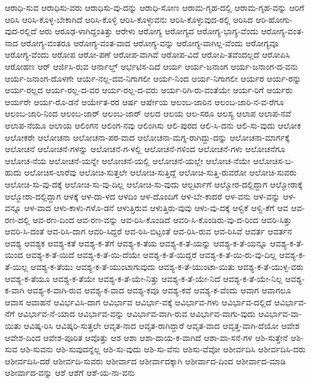 ಆರಾಧಿ-ಸುವ
ಆರಾಧಿಸು-ವರು
ಆರಾಧಿಸು-ವು-ದನ್ನು
ಆರಾಧಿ-ಸೋಣ
ಆರಾಮ-ಗೃಹ-ದಲ್ಲಿ
ಆರಾಮ-ಗೃಹ-ವನ್ನು
ಆರಿಗೆ
ಆರಿಸಿ
ಆರಿಸಿ-ಕೊಳ್ಳ-ಬೇಕಾಗಿದೆ
ಆರಿಸಿ-ಕೊಳ್ಳಿ
ಆರಿಸಿ-ಕೊಳ್ಳುವನು
ಆರಿಸಿ-ಕೊಳ್ಳುವುದ-ರಲ್ಲಿ
ಆರಿಸಿದ
ಆರಿ-ಹೋಗು-ವುದ-ರಲ್ಲಿದೆ
ಆರು
ಆರೂಢ-ಳಾಗಿದ್ದಂತಿತ್ತು
ಆರೇಳು
ಆರೋಗ್ಯ
ಆರೋಗ್ಯದ
ಆರೋಗ್ಯ-ಭಾಗ್ಯ-ವೆಂದು
ಆರೋಗ್ಯ-ವಂತ-ನಾದ
ಆರೋಗ್ಯ-ವಂತರೂ
ಆರೋಗ್ಯ-ವಂತ-ವಾದ
ಆರೋಗ್ಯ-ವನ್ನು
ಆರೋಗ್ಯ-ವಾಗಿಲ್ಲ-ವೆಂದು
ಆರೋಗ್ಯವೂ
ಆರೋಗ್ಯ-ವೆಂದು
ಆರೋಪ
ಆರೋ-ಪಣೆ
ಆರೋಪ-ವಾಗಿವೆ
ಆರೋಪ-ವಿದೆ
ಆರೋಪಿ-ತವೆಂದಲ್ಲದೆ
ಆರೋಪಿಸಿ
ಆರೋಹಣ
ಆರ್
ಆರ್ಜಿಸಿ-ರುವ
ಆರ್ನಾಲ್ಡ್
ಆರ್ಭಟಿಸ-ದಿದೆ
ಆರ್ಯ
ಆರ್ಯ-ಜನಾಂಗ
ಆರ್ಯ-ಜನಾಂಗ-ದ-ವನು
ಆರ್ಯ-ಜನಾಂಗ-ದೊಳಗೇ
ಆರ್ಯ-ನಲ್ಲ-ದವ-ನಿಗಾಗಲೀ
ಆರ್ಯ-ನಿಂದ
ಆರ್ಯ-ನಿಗಾಗಲೀ
ಆರ್ಯರ
ಆರ್ಯ-ರನ್ನು
ಆರ್ಯ-ರಲ್ಲದ
ಆರ್ಯ-ರಲ್ಲ-ದ-ವರ
ಆರ್ಯ-ರಲ್ಲ-ದ-ವರು
ಆರ್ಯ-ರಿಗಿ-ರು-ವಂತೆಯೇ
ಆರ್ಯ-ರಿಗೆ
ಆರ್ಯರು
ಆರ್ಯರೇ
ಆರ್ಯ-ರೊ-ಡನೆ
ಆರ್ಯೇತ-ರರ
ಆರ್ಷ
ಆರ್ಷೇಯ
ಆಲಂಬ-ಜಾರಿನ
ಆಲಂಬ-ಜಾರಿ-ನ-ವ-ರೆಗೂ
ಆಲಂಬ-ಜಾರಿ-ನಿಂದ
ಆಲಂಬ-ಜಾರ್
ಆಲಂಬ-ಜಾರ್‌
ಆಲದ
ಆಲಯ
ಆಲ-ಸರೂ
ಆಲಸ್ಯ
ಆಲಾಪ
ಆಲಾಪ-ನವೆ
ಆಲಾಪ-ನೆಯೂ
ಆಲಾಯ
ಆಲಿಂಗನ
ಆಲಿಂಗ-ನವು
ಆಲಿಂಗಿಸು
ಆಲಿ-ಪುರದ
ಆಲಿ-ಸಿ-ದನು
ಆಲಿ-ಸು-ವುದು
ಆಲೋಕ
ಆಲೋಕರೇ
ಆಲೋಚನಾ
ಆಲೋಚನಾ-ಪರ-ವಾದ
ಆಲೋಚನಾ-ಮಗ್ನ-ರಾಗಿದ್ದು-ದನ್ನು
ಆಲೋಚನಾ-ಮಾರ್ಗಕ್ಕೆ
ಆಲೋಚನೆ
ಆಲೋಚನೆ-ಗಳನ್ನು
ಆಲೋಚನೆ-ಗ-ಳಲ್ಲಿ
ಆಲೋಚನೆ-ಗಳಿಂದ
ಆಲೋಚನೆ-ಗಳು
ಆಲೋಚನೆಗೂ
ಆಲೋಚ-ನೆಯ
ಆಲೋಚನೆ-ಯನ್ನೇ
ಆಲೋಚನೆ-ಯಲ್ಲಿ
ಆಲೋಚನೆ-ಯಲ್ಲೇ
ಆಲೋಚ-ನೆಯೇ
ಆಲೋಚಿಸ-ಬ-ಹುದು
ಆಲೋಚಿಸ-ಲಾರೆವು
ಆಲೋಚಿ-ಸುತ್ತಲೇ
ಆಲೋಚಿ-ಸುತ್ತಿದ್ದೆ
ಆಲೋಚಿ-ಸುತ್ತಿ-ರುವರೋ
ಆಲೋಚಿ-ಸುವರು
ಆಲೋಚಿ-ಸು-ವು-ದಕ್ಕೆ
ಆಲೋಚಿ-ಸು-ವು-ದಿಲ್ಲ
ಆಲೋಚಿ-ಸು-ವುದು
ಆಲ್ಬರ್ಟಾಗೆ
ಆಲ್ಮೋರ-ದಲ್ಲಿದ್ದಾಗ
ಆಲ್ಮೋರಾಕ್ಕೆ
ಆಲ್ಮೋರಾ-ದಲ್ಲಿದ್ದಾಗ
ಆಳಕ್ಕೆ
ಆಳ-ದಾ-ಳದ
ಆಳದಿಂ
ಆಳ-ದೊಂದಿಗೆ
ಆಳ-ಬೇ-ಕಾದರೆ
ಆಳ-ವನು
ಆಳ-ವನ್ನು
ಆಳ-ವನ್ನೂ
ಆಳ-ವಾದ
ಆಳು-ಕಾಳು-ಗಳೊ-ಡನೆ
ಆಳುತ್ತಿರುವ
ಆಳುತ್ತಿರು-ವುವು
ಆಳು-ವು-ದಕ್ಕೆ
ಆಳ್ವಿಕೆ
ಆಳ್ವಿ-ಕೆಗೆ
ಆವ
ಆವ-ರಣ-ದಲ್ಲಿ
ಆವ-ರಣ-ದಿಂದ
ಆವ-ರಣ-ವನ್ನು
ಆವ-ರಿಸಿ-ಕೊಂಡಿದೆ
ಆವರಿ-ಸಿ-ಕೊಂಡಿರು-ವು-ದ-ರಿಂದ
ಆವರಿ-ಸಿತ್ತು
ಆವರಿ-ಸಿ-ದಂತೆ
ಆವ-ರಿಸಿ-ದಾಗ
ಆವರಿ-ಸಿದ್ದರೆ
ಆವ-ರಿಸಿ-ಬಿಟ್ಟಂತೆ
ಆವ-ರಿಸಿ-ರುವ
ಆವ-ರಿಸಿವೆ
ಆವರ್ತ
ಆವರ್ತನ
ಆವಶ್ಯ
ಆವಶ್ಯಕ
ಆವಶ್ಯ-ಕತೆ
ಆವಶ್ಯ-ಕ-ತೆಗೆ
ಆವಶ್ಯ-ಕ-ತೆಯ
ಆವಶ್ಯ-ಕ-ತೆ-ಯನ್ನು
ಆವಶ್ಯ-ಕ-ತೆ-ಯನ್ನೂ
ಆವಶ್ಯ-ಕ-ತೆ-ಯಿಂದ
ಆವಶ್ಯ-ಕ-ತೆ-ಯಿದೆ
ಆವಶ್ಯ-ಕ-ತೆ-ಯಿ-ದೆಯೇ
ಆವಶ್ಯ-ಕ-ತೆ-ಯಿದ್ದರೆ
ಆವಶ್ಯ-ಕ-ತೆ-ಯಿ-ರು-ವು-ದಿಲ್ಲ
ಆವಶ್ಯ-ಕ-ತೆ-ಯಿಲ್ಲ
ಆವಶ್ಯ-ಕ-ತೆಯು
ಆವಶ್ಯ-ಕ-ತೆ-ಯುಂಟಾಗುವುದು
ಆವಶ್ಯ-ಕ-ತೆ-ಯುಂಟಾ-ಯಿತು
ಆವಶ್ಯ-ಕ-ತೆ-ಯುಳ್ಳ-ವರು
ಆವಶ್ಯ-ಕ-ತೆಯೂ
ಆವಶ್ಯ-ಕ-ತೆಯೇ
ಆವಶ್ಯ-ಕ-ತೆ-ಯೇ-ನಿತ್ತು
ಆವಶ್ಯ-ಕ-ತೆ-ಯೇ-ನಿದೆ
ಆವಶ್ಯ-ಕ-ತೆ-ಯೇ-ನಿಲ್ಲ
ಆವಶ್ಯ-ಕ-ವಾಗಿ
ಆವಶ್ಯ-ಕ-ವಾಗಿ-ರುವ
ಆವಶ್ಯ-ಕ-ವಾದ
ಆವಶ್ಯ-ಕವೂ
ಆವಶ್ಯ-ಕವೆ
ಆವಶ್ಯ-ಕ-ವೆಂದು
ಆವಾಗ
ಆವಾಗಲೂ
ಆವಾಸ
ಆವಾಹನೆ
ಆವಿರ್ಭವಿಸಿ-ದಾಗ
ಆವಿರ್ಭಾವ
ಆವಿರ್ಭಾ-ವಕ್ಕೆ
ಆವಿರ್ಭಾವ-ಗಳು
ಆವಿರ್ಭಾವ-ದಲ್ಲಿದೆ
ಆವಿರ್ಭಾವ-ನೆಗೆ
ಆವಿರ್ಭಾವ-ನೆ-ಯಾದ
ಆವಿರ್ಭಾವ-ವನ್ನು
ಆವಿರ್ಭಾವ-ವಾಗಿ-ರುವ
ಆವಿರ್ಭಾವ-ವಾಗು-ವುದು
ಆವಿರ್ಭಾವ-ವಾ-ಯಿತು
ಆವಿಷ್ಕ-ರಿಸಿ
ಆವಿಷ್ಕರಿ-ಸುತ್ತಲೇ
ಆವೃತ-ನಾದ
ಆವೃತ-ರಾಗಿದ್ದಾರೆ
ಆವೃತ-ವಾದ
ಆವೃತ್ತ-ವಾಗಿ-ದೆಯೋ
ಆವೇಶ
ಆವೇಶ-ದಿಂದ
ಆವೇಶ-ಪೂರಿತ
ಆವೊತ್ತು
ಆಶ
ಆಶಾ
ಆಶಾ-ದಾಯ-ಕ-ವಾಗಿದೆ
ಆಶಾ-ವಾ-ಸನೆ-ಗಳ
ಆಶಿ-ಸುತ್ತೇನೆ
ಆಶಿ-ಸುವ
ಆಶಿ-ಸುವನು
ಆಶಿ-ಸುವುದನ್ನೆಲ್ಲ
ಆಶಿ-ಸು-ವುದು
ಆಶಿ-ಸು-ವೆನು
ಆಶಿಸು-ವೆವೋ
ಆಶೀರ್ವದಿಸಿ
ಆಶೀರ್ವದಿಸಿ-ದರು
ಆಶೀರ್ವದಿಸಿ-ದರೆ
ಆಶೀರ್ವದಿ-ಸುವರು
ಆಶೀರ್ವಾದ
ಆಶೀರ್ವಾದಕ್ಕಾಗಿ
ಆಶೀರ್ವಾದ-ದಿಂದ
ಆಶೀರ್ವಾದ-ಮಾಡಿ
ಆಶೀರ್ವಾದ-ವನ್ನು
ಆಶೆ
ಆಶೆಗೆ
ಆಶೆ-ಯ-ನಾ-ವನು
